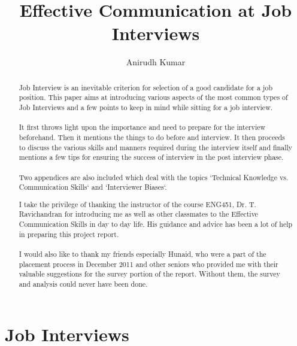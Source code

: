 \documentclass[a4paper,12pt]{report}
\title{Effective Communication at Job Interviews}
\author{Anirudh Kumar}
\begin{document}
\maketitle

\begin{abstract}

Job Interview is an inevitable criterion for selection of a good candidate for a job position. This paper aims at introducing various aspects
of the most common types of Job Interviews and a few points to keep in mind while sitting for a job interview.
\paragraph{}
It first throws light upon the importance and need to prepare for the interview beforehand. Then it mentions the
things to do before and interview. It then proceeds to discuss the various skills and manners required during the interview itself 
and finally mentions a few tips for ensuring the success of interview in the post interview phase.
\paragraph{}
Two appendices are also included which deal with the topics `Technical Knowledge vs. Communication Skills`
and `Interviewer Biases`.
\end{abstract}

\renewcommand{\abstractname}{Acknowledgements}
\begin{abstract}
I take the privilege of thanking the instructor of the course ENG451, Dr. T. Ravichandran
for introducing me as well as other classmates to the Effective Communication Skills
 in day to day life. His guidance and advice has been a lot of help in preparing this project report.
\paragraph{}
I would also like to thank my friends especially Hunaid, who were a part of the placement process in
December 2011 and other seniors who provided me with their valuable suggestions for
the survey portion of the report. Without them, the survey and analysis could never have
been done.
\end{abstract}

\tableofcontents

\chapter{Job Interviews}             %
\end{document}
